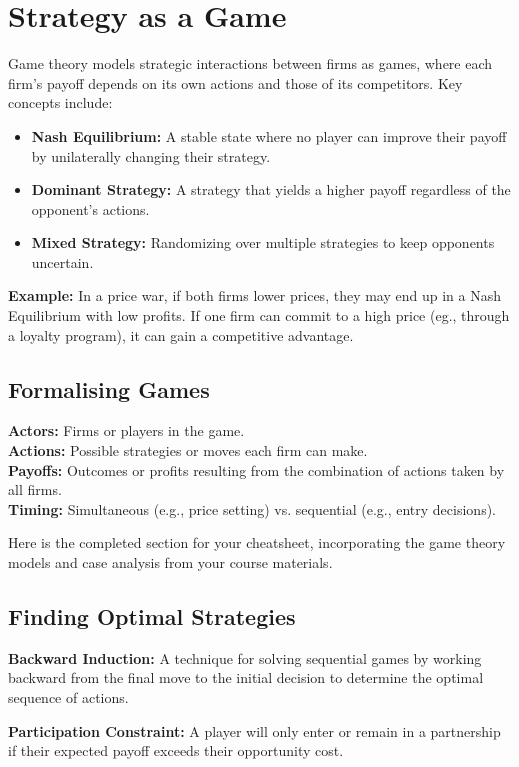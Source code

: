 \section{Strategy as a Game}
Game theory models strategic interactions between firms as games, where each
firm's payoff depends on its own actions and those of its competitors. Key
concepts include:

\begin{itemize}
    \item \textbf{Nash Equilibrium:} A stable state where no player can improve their payoff by
          unilaterally changing their strategy.
    \item \textbf{Dominant Strategy:} A strategy that yields a higher payoff regardless of the
          opponent's actions.
    \item \textbf{Mixed Strategy:} Randomizing over multiple strategies to keep opponents
          uncertain.
\end{itemize}

\textbf{Example:} In a price war, if both firms lower prices, they may end up in a Nash
Equilibrium with low profits. If one firm can commit to a high price (eg.,
through a loyalty program), it can gain a competitive advantage.

\subsection{Formalising Games}
\textbf{Actors:} Firms or players in the game. \\
\textbf{Actions:} Possible strategies or moves each firm can make. \\
\textbf{Payoffs:} Outcomes or profits resulting from the combination of actions taken
by all firms. \\
\textbf{Timing:} Simultaneous (e.g., price setting) vs. sequential (e.g., entry
decisions).

Here is the completed section for your cheatsheet, incorporating the game
theory models and case analysis from your course materials.

\subsection{Finding Optimal Strategies}
\textbf{Backward Induction:} A technique for solving sequential games by working
backward from the final move to the initial decision to determine the optimal
sequence of actions.

\textbf{Participation Constraint:} A player will only enter or remain in a partnership
if their expected payoff exceeds their opportunity cost.

